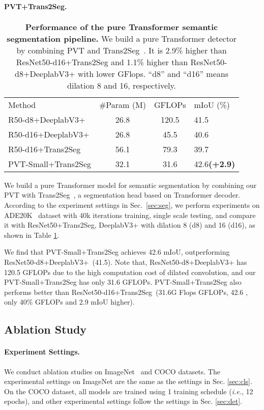\documentclass[10pt,twocolumn,letterpaper]{article}
\newlength\savedwidth
\newcommand\whline{\noalign{\global\savedwidth\arrayrulewidth\global\arrayrulewidth 0.8pt}\hline\noalign{\global\arrayrulewidth\savedwidth}}
\newcommand{\green}[1]{\textcolor[RGB]{96,177,87}{#1}}
\newcommand{\fn}[1]{\footnotesize{#1}}
\newcommand{\gbf}[1]{\green{\bf{\fn{(#1)}}}}
\def\ie{\emph{i.e.}}
\begin{document}
\paragraph{PVT+Trans2Seg.}
\begin{table}[t]
    \centering
\setlength{\tabcolsep}{0.7mm}
    \begin{tabular}{l|c|c|l}
Method & \#Param (M) &GFLOPs & mIoU (\%)   \\
	\whline
	R50-d8+DeeplabV3+  &26.8&120.5 &41.5\\
	R50-d16+DeeplabV3+  &26.8&45.5 &40.6\\
	\hline
	R50-d16+Trans2Seg  & 56.1&79.3 & 39.7\\
\rowcolor{mygray} PVT-Small+Trans2Seg   &32.1 &31.6&42.6\gbf{+2.9}\\
	
\end{tabular}     \caption{\textbf{Performance of the pure Transformer semantic segmentation pipeline.} We build a pure Transformer detector by combining PVT and Trans2Seg~\cite{xie2021segmenting}. It is 2.9\% higher than ResNet50-d16+Trans2Seg and 1.1\% higher than ResNet50-d8+DeeplabV3+ with lower GFlops. ``d8'' and ``d16'' means dilation 8 and 16, respectively. }
    \label{tab:trans2seg}
\end{table}
We build 
a
pure Transformer model for semantic segmentation by combining our PVT with Trans2Seg~\cite{xie2021segmenting}, a 
segmentation head based on Transformer decoder.
According to the experiment settings in Sec.~\ref{sec:seg}, we perform experiments on ADE20K~\cite{zhou2017scene} dataset with 40k iterations training, single scale testing, and compare it with ResNet50+Trans2Seg, DeeplabV3+ with dilation 8 (d8) and 16 (d16), as shown in Table \ref{tab:trans2seg}. 

We find that PVT-Small+Trans2Seg achieves 42.6 mIoU, outperforming ResNet50-d8+DeeplabV3+~(41.5).
Note that, ResNet50-d8+DeeplabV3+ has 120.5 GFLOPs due to the high computation cost of dilated convolution, and our PVT-Small+Trans2Seg has only 31.6 GFLOPs.
PVT-Small+Trans2Seg also performs better than ResNet50-d16+Trans2Seg~(31.6G Flops  GFLOPs, 42.6 , only 40\% GFLOPs and 2.9 mIoU higher).



\subsection{Ablation Study}
\paragraph{Experiment Settings.}
We conduct ablation studies on ImageNet~\cite{deng2009imagenet} and COCO\cite{lin2014microsoft} datasets.
The experimental settings on ImageNet are the same as the settings in Sec. \ref{sec:cls}.
On the COCO dataset, all models are trained using 1 training schedule (\ie, 12 epochs), and other experimental settings follow the settings in Sec. \ref{sec:det}.
\end{document}
